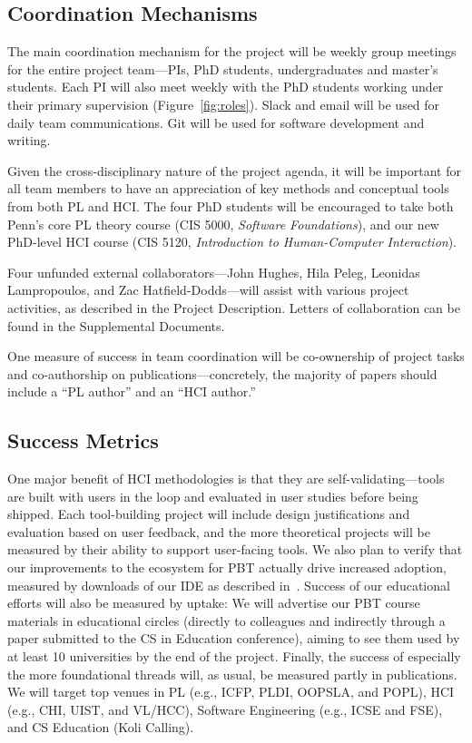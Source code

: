 \subsection*{Coordination Mechanisms}

The main coordination mechanism for the project will be weekly group
meetings for the entire project team---PIs, PhD students, undergraduates and master's students.
%
Each PI will also meet weekly with the PhD students working under
their primary supervision (Figure~\ref{fig:roles}).
%
Slack and email will be used for daily team communications.  Git will
be used for software development and writing.

Given the cross-disciplinary nature of the project agenda, it will be
important for all team members to have an appreciation of key methods
and conceptual tools from both PL and HCI.  The four PhD students will
be encouraged to take both Penn's core PL theory course (CIS 5000,
{\em Software Foundations}), and our new PhD-level HCI course (CIS
5120, {\em Introduction to Human-Computer Interaction}).

Four unfunded external collaborators---John Hughes, Hila Peleg,
Leonidas Lampropoulos, and Zac Hatfield-Dodds---will assist with
various project activities, as described in the Project Description.
Letters of collaboration can be found in the Supplemental Documents.

One measure of success in team coordination will be co-ownership of
project tasks and co-authorship on publications---concretely, the
majority of papers should include a ``PL author'' and
an ``HCI author.''

\subsection*{Success Metrics}

One major benefit of
HCI methodologies is that they are self-validating---tools are built with users
in the loop and evaluated in user studies before being shipped.
Each tool-building project will include design justifications and
evaluation based on user feedback, and the more theoretical
projects will be measured by their ability to support user-facing tools.
%
We also plan to verify that our improvements to the ecosystem for PBT
actually drive increased adoption, measured by
downloads of our \tyche{} IDE as described in~.
%
Success of our educational efforts will also be measured by uptake: We
will advertise our PBT course materials in educational circles
(directly to colleagues and indirectly through a paper
submitted to the CS in Education conference), aiming to see them used
by at least 10 universities by the end of the project.
%
Finally, the
success of especially the more foundational threads will, as usual, be measured
partly in publications.  We will target top venues in PL (e.g., ICFP, PLDI,
OOPSLA, and POPL), HCI (e.g., CHI, UIST, and VL/HCC), Software Engineering
(e.g., ICSE and FSE), and CS Education (Koli Calling).

\clearpage
